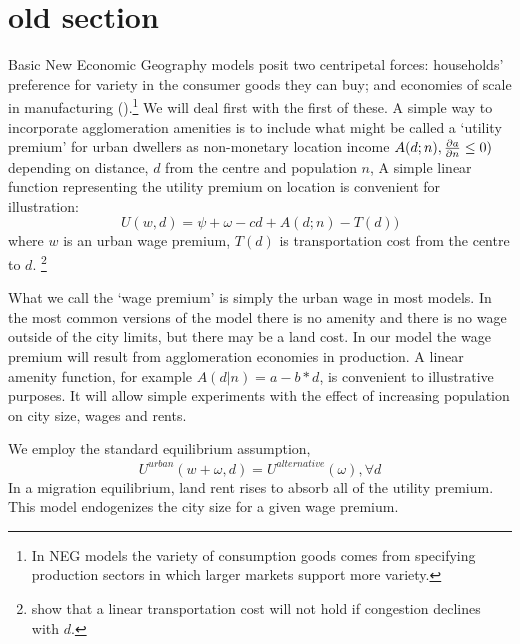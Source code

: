 \section{old section}
Basic New Economic Geography models posit two centripetal forces: households' preference for variety in the consumer goods they can buy; and economies of scale in manufacturing (\cite{gurwitzCatastrophicAgglomeration2019}).\footnote{In NEG models the variety of consumption goods comes from specifying production sectors in which larger markets support more variety.} We will deal first with the first of these.  A simple way to incorporate agglomeration amenities is to include what might be called a `utility premium' for urban dwellers  as non-monetary location income 
$A(d; n), \frac{\partial a}{\partial n}\leq 0)$ depending on distance, $d$ from the centre and population $n$, A simple linear  function representing the utility premium on location is convenient for illustration:
\begin{equation}
U(w,d)= \psi+ \omega-cd + A(d; n) - T(d))
\label{eqn-u}
\end{equation}
where $w$  is an urban wage premium, $T(d)$ is transportation cost from the centre to $d$.
\footnote{\cite{anasUrbanSpatialStructure1998} show that a linear transportation cost will not  hold if congestion declines  with $d$.} %

What we call the `wage premium' is simply the urban wage in most models.  In the most common versions of the model there is no amenity and there is no wage outside of the city limits, but there may be a land cost. In our model the wage premium will result from agglomeration economies in production.
A linear amenity function, for example $A(d|n)= a-b*d$, is convenient to illustrative purposes.  It will allow simple experiments with the effect of  increasing population on city size, wages and rents. 


We employ the standard equilibrium assumption, \[ U^{urban}(w+\omega, d)=U^{alternative}(\omega), \forall  d\] 
In a migration equilibrium, land rent rises to absorb all of the utility premium. This model endogenizes the city size for a given wage premium. 


